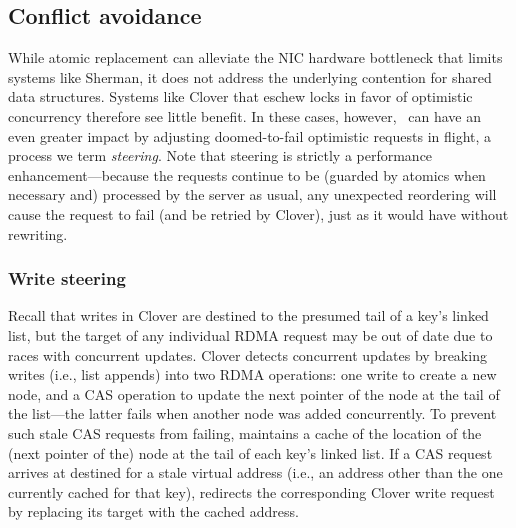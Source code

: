 
\subsection{Conflict avoidance}

While atomic replacement can alleviate the NIC hardware bottleneck
that limits systems like Sherman, it does not address the underlying
contention for shared data structures.  Systems like Clover that
eschew locks in favor of optimistic concurrency therefore see little
benefit.  In these cases, however, \sword\ can have an even greater
impact by adjusting doomed-to-fail optimistic requests in flight, a process we term \emph{steering}.
%
Note that steering is strictly a performance
enhancement---because the requests continue to be (guarded by atomics
when necessary and) processed by the server as usual, any unexpected
reordering will cause the request to fail (and be retried by Clover),
just as it would have without rewriting.


\subsubsection{Write steering}

Recall that writes in Clover are destined to the presumed tail of a
key's linked list, but the target of any individual RDMA request may
be out of date due to races with concurrent updates.  Clover detects
concurrent updates by breaking writes (i.e., list appends) into two
RDMA operations: one write to create a new node, and a CAS operation
to update the next pointer of the node at the tail of the list---the
latter fails when another node was added concurrently.  To prevent
such stale CAS requests from failing, {\sword} maintains a cache of
the location of the (next pointer of the) node at the tail of each
key's linked list. If a CAS request arrives at {\sword} destined for a
stale virtual address (i.e., an address other than the one currently
cached for that key), {\sword} redirects the corresponding Clover
write request by replacing its target with the cached address.

